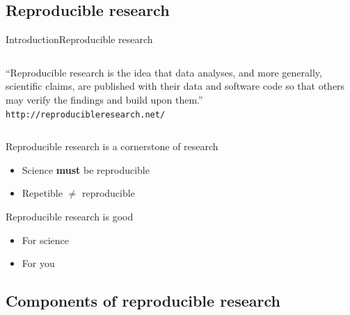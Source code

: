 \documentclass{beamer}
\begin{document}
\subsection{Reproducible research}

\begin{frame}{Introduction}{Reproducible research}
	\vspace{-0.3cm}
	\begin{center}
	\begin{columns}
	\begin{block}{}
	\begin{center}
	``Reproducible research is the idea that data analyses, and more generally, scientific claims, are published with their data and software code so that others may verify the findings and build upon them.''\\ 
	\texttt{http://reproducibleresearch.net/}
	\end{center}
	\end{block}
	\end{columns}
	\end{center}
	
	Reproducible research is a cornerstone of research
    \begin{itemize}
	\item Science \textbf{must} be reproducible
    \item Repetible $\ne$ reproducible
    \end{itemize}

    Reproducible research is good
    \begin{itemize}
    \item For science
    \item For you
    \end{itemize}
\end{frame}

\subsection{Components of reproducible research}
\end{document}
